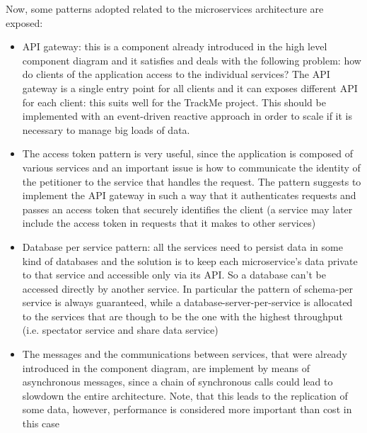 Now, some patterns adopted related to the microservices architecture are exposed:
\begin{itemize}
\item API gateway: this is a component already introduced in the high level component diagram and it
satisfies and deals with the following problem: how do clients of the application access to the individual
services? The API gateway is a single entry point for all clients and it can exposes different API for
each client: this suits well for the TrackMe project. This should be implemented with an event-driven
reactive approach in order to scale if it is necessary to manage big loads of data. \\
\item The access token pattern is very useful, since the application is composed of various services and
an important issue is how to communicate the identity of the petitioner to the service that handles the
request. 
The pattern suggests to implement the API gateway in such
a way that it authenticates requests and passes an access token that securely identifies the client (a
service may later include the access token in requests that it makes to other services)
\item Database per service pattern: all the services need to persist data in some kind of databases and
the solution is to keep each microservice's data private to that service and accessible only via its API.
So a database can't be accessed directly by another service. In particular the pattern of schema-per
service is always guaranteed, while a database-server-per-service is allocated to the services that are
though to be the one with the highest throughput (i.e. spectator service and share data service)
\item The messages and the communications between services, that were already introduced in the component diagram, are implement by means of asynchronous messages, since a chain of synchronous calls could lead to slowdown the entire architecture. Note, that this leads to the replication of some data, however, performance is considered more important than cost in this case 
\end{itemize}